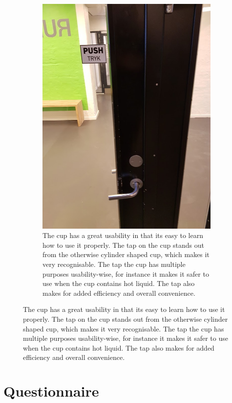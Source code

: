 \documentclass[11pt]{article}
\begin{document}
\begin{figure}[!h]
\begin{subfigure}[t]{0.5\textwidth}
        \label{fig:cup}
    \end{subfigure}
    \begin{subfigure}[t]{0.5\textwidth}
        \includegraphics[scale=0.4]{InteraktionsDesign/Assets/door.jpg}
        \caption{The cup has a great usability in that its easy to learn how to use it properly. The tap on the cup stands out from the otherwise cylinder shaped cup, which makes it very recognisable. The tap the cup has multiple purposes usability-wise, for instance it makes it safer to use when the cup contains hot liquid. The tap also makes for added efficiency and overall convenience.}
        \label{fig:cup}
    \end{subfigure}
\end{figure}

\newpage

\section{Questionnaire}
\end{document}
